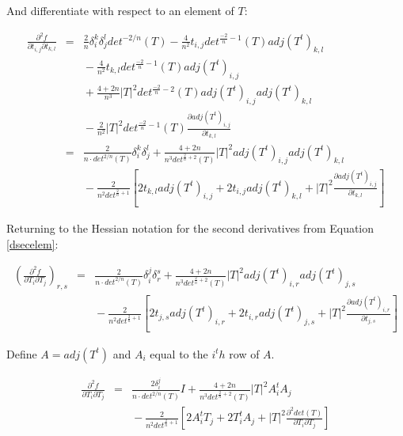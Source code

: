 \documentclass{report}
\begin{document}
\noindent And differentiate with respect to an element of $T$:

\begin{eqnarray}
\nonumber
\frac{\partial^2 f}{\partial t_{i,j} \partial t_{k,l}} & = &
\frac{2}{n} \delta_i^k \delta_j^l det^{-2/n}(T) 
  - \frac{4}{n^2} t_{i,j} det^{\frac{-2}{n}-1}(T) adj(T^t)_{k,l} \\
\nonumber
  & & {} - \frac{4}{n^2}t_{k,l} det^{\frac{-2}{n} - 1}(T) adj(T^t)_{i,j} \\
\nonumber
  & & {} + \frac{4+2n}{n^3} |T|^2 det^{\frac{-2}{n} - 2}(T) adj(T^t)_{i,j} adj(T^t)_{k,l} \\
  & & {} - \frac{2}{n^2} |T|^2 det^{\frac{-2}{n} - 1}(T) \frac{\partial adj(T^t)_{i,j}}{\partial t_{k,l}} \\
 & = & \frac{2}{n \cdot det^{2/n}(T)} \delta_i^k \delta_j^l
     + \frac{4 + 2n}{n^3 det^{\frac{2}{n}+2}(T)} |T|^2 adj(T^t)_{i,j} adj(T^t)_{k,l} \\
\nonumber
& & {} - \frac{2}{n^2 det^{\frac{2}{n}+1}} \left[ 
     2 t_{k,l} adj(T^t)_{i,j} + 2 t_{i,j} adj(T^t)_{k,l}
     + |T|^2 \frac{\partial adj(T^t)_{i,j}}{\partial t_{k,l}} \right] 
\end{eqnarray}

\noindent Returning to the Hessian notation for the second derivatives from Equation \ref{dsecelem}:


\begin{eqnarray}
\left(\frac{\partial^2 f}{\partial T_i \partial T_j}\right)_{r,s} &=&
\frac{2}{n \cdot det^{2/n}(T)} \delta_i^j \delta_r^s
     + \frac{4 + 2n}{n^3 det^{\frac{2}{n}+2}(T)} |T|^2 adj(T^t)_{i,r} adj(T^t)_{j,s} \\
\nonumber
& & {} - \frac{2}{n^2 det^{\frac{2}{n}+1}} \left[ 
     2 t_{j,s} adj(T^t)_{i,r} + 2 t_{i,r} adj(T^t)_{j,s}
     + |T|^2 \frac{\partial adj(T^t)_{i,r}}{\partial t_{j,s}} \right] 
\end{eqnarray}

\noindent Define $A = adj(T^t)$ and $A_i$ equal to the $i^th$ row of $A$.

\begin{eqnarray}
\frac{\partial^2 f}{\partial T_i \partial T_j}
&=& \frac{2 \delta_i^j}{n \cdot det^{2/n}(T)} I
+ \frac{4 + 2n}{n^3 det^{\frac{2}{n}+2}(T)} |T|^2 A_i^t A_j \\ \nonumber
& & {} - \frac{2}{n^2 det^{\frac{2}{n}+1}} \left[ 
2 A_i^t T_j + 2 T_i^t A_j + |T|^2 \frac{\partial^2 det(T)}{\partial T_i \partial T_j} \right]
\end{eqnarray}
\end{document}
